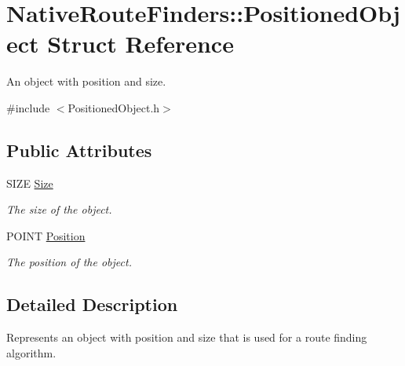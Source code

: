 \hypertarget{struct_native_route_finders_1_1_positioned_object}{\section{Native\-Route\-Finders\-:\-:Positioned\-Object Struct Reference}
\label{struct_native_route_finders_1_1_positioned_object}
}


An object with position and size.  




{\ttfamily \#include $<$Positioned\-Object.\-h$>$}

\subsection*{Public Attributes}
\begin{DoxyCompactItemize}
\item 
\hypertarget{struct_native_route_finders_1_1_positioned_object_a49c049341e650f3ff022c5968c731052}{S\-I\-Z\-E \hyperlink{struct_native_route_finders_1_1_positioned_object_a49c049341e650f3ff022c5968c731052}{Size}}\label{struct_native_route_finders_1_1_positioned_object_a49c049341e650f3ff022c5968c731052}

\begin{DoxyCompactList}\small\item\em The size of the object. \end{DoxyCompactList}\item 
\hypertarget{struct_native_route_finders_1_1_positioned_object_a7c7c7f6f18988097e6d8ce53e2904346}{P\-O\-I\-N\-T \hyperlink{struct_native_route_finders_1_1_positioned_object_a7c7c7f6f18988097e6d8ce53e2904346}{Position}}\label{struct_native_route_finders_1_1_positioned_object_a7c7c7f6f18988097e6d8ce53e2904346}

\begin{DoxyCompactList}\small\item\em The position of the object. \end{DoxyCompactList}\end{DoxyCompactItemize}


\subsection{Detailed Description}
Represents an object with position and size that is used for a route finding algorithm.

